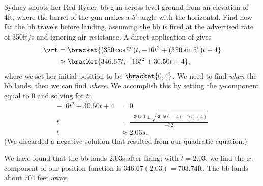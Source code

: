 \begin{example}\label{ex_motion5}
Sydney shoots her Red Ryder\textregistered\ bb gun across level ground from an elevation of 4ft, where the barrel of the gun makes a $5^\circ$ angle with the horizontal. Find how far the bb travels before landing, assuming the bb is fired at the advertised rate of 350ft/s and ignoring air resistance.
\solution
A direct application of  gives
\begin{align*}
\vrt &=\bracket{(350\cos 5^\circ)t, -16t^2 + (350\sin 5^\circ)t + 4}\\
&\approx\bracket{346.67t, -16t^2+30.50t+4},
\end{align*}
where we set her initial position to be $\bracket{0,4}$.
We need to find \emph{when} the bb lands, then we can find \emph{where}. We accomplish this by setting the $y$-component equal to 0 and solving for $t$:
\begin{align*}
-16t^2+30.50t+4 &= 0 \\
t &= \frac{-30.50 \pm \sqrt{30.50^2-4(-16)(4)}}{-32}\\
t &\approx 2.03s.
\end{align*}
(We discarded a negative solution that resulted from our quadratic equation.) 

We have found that the bb lands 2.03s after firing; with $t=2.03$, we find the $x$-component of our position function is $346.67(2.03) = 703.74$ft. The bb lands about 704 feet away.
\end{example}

